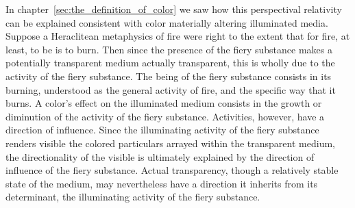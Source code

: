 In chapter~\ref{sec:the_definition_of_color} we saw how this perspectival relativity can be explained consistent with color materially altering illuminated media. Suppose a Heraclitean metaphysics of fire were right to the extent that for fire, at least, to be is to burn. Then since the presence of the fiery substance makes a potentially transparent medium actually transparent, this is wholly due to the activity of the fiery substance. The being of the fiery substance consists in its burning, understood as the general activity of fire, and the specific way that it burns. A color's effect on the illuminated medium consists in the growth or diminution of the activity of the fiery substance. Activities, however, have a direction of influence. Since the illuminating activity of the fiery substance renders visible the colored particulars arrayed within the transparent medium, the directionality of the visible is ultimately explained by the direction of influence of the fiery substance. Actual transparency, though a relatively stable state of the medium, may nevertheless have a direction it inherits from its determinant, the illuminating activity of the fiery substance.

